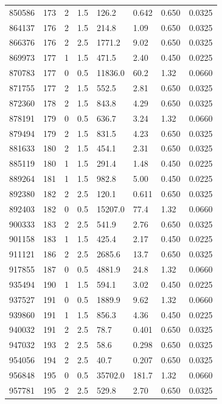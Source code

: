\documentclass[preview]{standalone}
\begin{document}
{{{{{{\begin{tabular}{L{1.2cm}C{1.2cm} C{0.3cm}C{0.5cm} C{1.4cm}C{1.4cm} C{1.4cm}C{1.4cm}}
  850586  &   173  & 2     & 1.5 &  126.2  & 0.642  & 0.650 &  0.0325   \\ 
  864137  &   176  & 2     & 1.5 &  214.8  & 1.09  & 0.650 &  0.0325   \\ 
  866376  &   176  & 2     & 2.5 &  1771.2  & 9.02  & 0.650 &  0.0325   \\ 
  869973  &   177  & 1     & 1.5 &  471.5  & 2.40  & 0.450 &  0.0225   \\ 
  870783  &   177  & 0     & 0.5 &  11836.0  & 60.2  & 1.32 &  0.0660   \\ 
  871755  &   177  & 2     & 1.5 &  552.5  & 2.81  & 0.650 &  0.0325   \\ 
  872360  &   178  & 2     & 1.5 &  843.8  & 4.29  & 0.650 &  0.0325   \\ 
  878191  &   179  & 0     & 0.5 &  636.7  & 3.24  & 1.32 &  0.0660   \\ 
  879494  &   179  & 2     & 1.5 &  831.5  & 4.23  & 0.650 &  0.0325   \\ 
  881633  &   180  & 2     & 1.5 &  454.1  & 2.31  & 0.650 &  0.0325   \\ 
  885119  &   180  & 1     & 1.5 &  291.4  & 1.48  & 0.450 &  0.0225   \\ 
  889264  &   181  & 1     & 1.5 &  982.8  & 5.00  & 0.450 &  0.0225   \\ 
  892380  &   182  & 2     & 2.5 &  120.1  & 0.611  & 0.650 &  0.0325   \\ 
  892403  &   182  & 0     & 0.5 &  15207.0  & 77.4  & 1.32 &  0.0660   \\ 
  900333  &   183  & 2     & 2.5 &  541.9  & 2.76  & 0.650 &  0.0325   \\ 
  901158  &   183  & 1     & 1.5 &  425.4  & 2.17  & 0.450 &  0.0225   \\ 
  911121  &   186  & 2     & 2.5 &  2685.6  & 13.7  & 0.650 &  0.0325   \\ 
  917855  &   187  & 0     & 0.5 &  4881.9  & 24.8  & 1.32 &  0.0660   \\ 
  935494  &   190  & 1     & 1.5 &  594.1  & 3.02  & 0.450 &  0.0225   \\ 
  937527  &   191  & 0     & 0.5 &  1889.9  & 9.62  & 1.32 &  0.0660   \\ 
  939860  &   191  & 1     & 1.5 &  856.3  & 4.36  & 0.450 &  0.0225   \\ 
  940032  &   191  & 2     & 2.5 &  78.7  & 0.401  & 0.650 &  0.0325   \\ 
  947032  &   193  & 2     & 2.5 &  58.6  & 0.298  & 0.650 &  0.0325   \\ 
  954056  &   194  & 2     & 2.5 &  40.7  & 0.207  & 0.650 &  0.0325   \\ 
  956848  &   195  & 0     & 0.5 &  35702.0  & 181.7  & 1.32 &  0.0660   \\ 
  957781  &   195  & 2     & 2.5 &  529.8  & 2.70  & 0.650 &  0.0325   \\ 
\hline 
\end{tabular} 

}}}}}}
\end{document}
